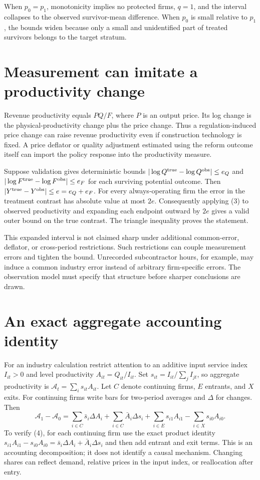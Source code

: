 \documentclass[11pt,a4paper]{article}
\begin{document}
When $p_0=p_1$, monotonicity implies no protected firms, $q=1$, and the interval collapses to the observed survivor-mean difference. When $p_0$ is small relative to $p_1$, the bounds widen because only a small and unidentified part of treated survivors belongs to the target stratum.
\section{Measurement can imitate a productivity change}
Revenue productivity equals $P Q/F$, where $P$ is an output price. Its log change is the physical-productivity change plus the price change. Thus a regulation-induced price change can raise revenue productivity even if construction technology is fixed. A price deflator or quality adjustment estimated using the reform outcome itself can import the policy response into the productivity measure.

Suppose validation gives deterministic bounds
$|\log Q^{\rm true}-\log Q^{\rm obs}|\le e_Q$ and
$|\log F^{\rm true}-\log F^{\rm obs}|\le e_F$ for each surviving potential outcome. Then
$|Y^{\rm true}-Y^{\rm obs}|\le e=e_Q+e_F$.
For every always-operating firm the error in the treatment contrast has absolute value at most $2e$. Consequently applying (3) to observed productivity and expanding each endpoint outward by $2e$ gives a valid outer bound on the true contrast. The triangle inequality proves the statement.

This expanded interval is not claimed sharp under additional common-error, deflator, or cross-period restrictions. Such restrictions can couple measurement errors and tighten the bound. Unrecorded subcontractor hours, for example, may induce a common industry error instead of arbitrary firm-specific errors. The observation model must specify that structure before sharper conclusions are drawn.
\section{An exact aggregate accounting identity}
For an industry calculation restrict attention to an additive input service index $I_{it}>0$ and level productivity $A_{it}=Q_{it}/I_{it}$. Set
$s_{it}=I_{it}/\sum_jI_{jt}$, so aggregate productivity is
$\mathcal A_t=\sum_i s_{it}A_{it}$. Let $C$ denote continuing firms, $E$ entrants, and $X$ exits. For continuing firms write bars for two-period averages and $\Delta$ for changes. Then
\[
 \mathcal A_1-\mathcal A_0
 =\sum_{i\in C}\bar s_i\Delta A_i
 +\sum_{i\in C}\bar A_i\Delta s_i
 +\sum_{i\in E}s_{i1}A_{i1}
 -\sum_{i\in X}s_{i0}A_{i0}.
 \tag{4}
\]
To verify (4), for each continuing firm use the exact product identity
$s_{i1}A_{i1}-s_{i0}A_{i0}=\bar s_i\Delta A_i+\bar A_i\Delta s_i$ and then add entrant and exit terms. This is an accounting decomposition; it does not identify a causal mechanism. Changing shares can reflect demand, relative prices in the input index, or reallocation after entry.
\end{document}
